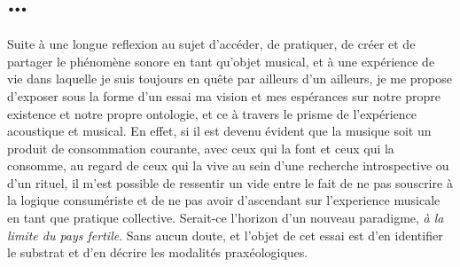 \documentclass{article}
\begin{document}
\section{…}
Suite à une longue reflexion au sujet d'accéder, de pratiquer, de créer et de partager le phénomène sonore en tant qu'objet musical, et à une expérience de vie dans laquelle je suis toujours en quête par ailleurs d'un ailleurs, 
 je me propose d'exposer sous la forme d'un essai ma vision et mes espérances sur notre propre existence et notre propre ontologie, et ce à travers le prisme de l'expérience acoustique et musical. En effet, si il est devenu évident que la musique soit un produit de consommation courante, avec ceux qui la font et ceux qui la consomme, au regard de ceux qui la vive au sein d'une recherche introspective ou d'un rituel,
il m'est possible de ressentir un vide entre le fait de ne pas souscrire à la logique consumériste et de ne pas avoir d'ascendant sur l'experience musicale en tant que pratique collective.
Serait-ce l'horizon d'un nouveau paradigme, \textit{à la limite du pays fertile}. %
Sans aucun doute, et l'objet de cet essai est d'en identifier le substrat et d'en décrire les modalités praxéologiques\label{efn:pr}. 
\end{document}

